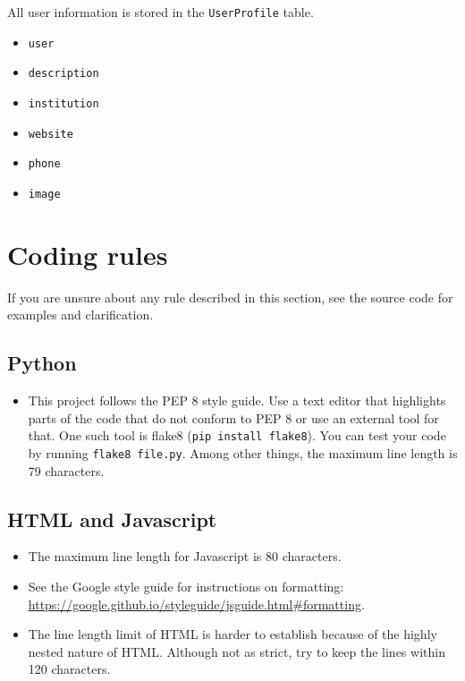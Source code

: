 \documentclass{article}
\begin{document}
All user information is stored in the \texttt{UserProfile} table.
\begin{tcolorbox}[colback=green!5,colframe=green!40!black,title=UserProfile]
  \begin{itemize}
  \item \texttt{user}
  \item \texttt{description}
  \item \texttt{institution}
  \item \texttt{website}
  \item \texttt{phone}
  \item \texttt{image}
  \end{itemize}
\end{tcolorbox}

\section{Coding rules}

If you are unsure about any rule described in this section, see the source code for examples and clarification.

\subsection{Python}

\begin{itemize}
\item This project follows the PEP 8 style guide. Use a text editor that highlights parts of the code that do not conform to PEP 8 or use an external tool for that. One such tool is flake8 (\texttt{pip install flake8}). You can test your code by running \texttt{flake8 file.py}. Among other things, the maximum line length is 79 characters.
\end{itemize}

\subsection{HTML and Javascript}

\begin{itemize}
\item The maximum line length for Javascript is 80 characters.
\item See the Google style guide for instructions on formatting:\\ \url{https://google.github.io/styleguide/jsguide.html#formatting}.
\item The line length limit of HTML is harder to establish because of the highly nested nature of HTML. Although not as strict, try to keep the lines within 120 characters.
\end{itemize}
\end{document}
